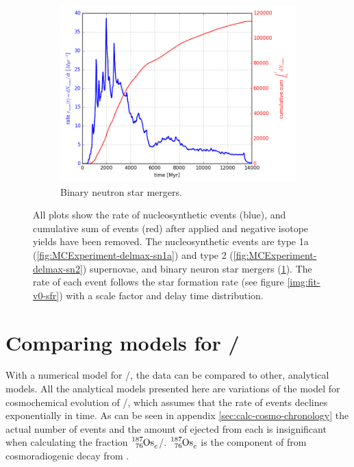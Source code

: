 \begin{figure}
\begin{subfigure}{\figwidth}
    \includegraphics[width=\linewidth]{results/MCExperiment_revised_2_delmax/nsm.png}
    \caption{ \label{fig:MCExperiment-delmax-nsm} \footnotesize
      Binary neutron star mergers.
    }
  \end{subfigure}
  \caption[Rate of nucleosynthetic events]{ \label{fig:MCExperiment-delmax-rate}
    All plots show the rate of nucleosynthetic events (blue), and cumulative sum of events (red)
    after \betadecay applied and negative isotope yields have been removed.
    The nucleosynthetic events are type 1a (\ref{fig:MCExperiment-delmax-sn1a}) and type 2 (\ref{fig:MCExperiment-delmax-sn2})
    supernovae, and binary neuron star mergers (\ref{fig:MCExperiment-delmax-nsm}).
    The rate of each event follows the star formation rate (see figure \ref{img:fit-v0-sfr}) with a scale factor and delay time distribution.
  } 
\end{figure}
\FloatBarrier %

\section{Comparing models for /}
With a numerical model for /, the data can be compared to other, analytical models.
All the analytical models presented here are variations of the  model for cosmochemical evolution of /,
which assumes that the rate of events declines exponentially in time.
As can be seen in appendix \ref{sec:calc-cosmo-chronology} the actual number of events and the amount of  ejected from each is insignificant when calculating the fraction $\os{187}_c$/. $\os{187}_c$ is the component of  from cosmoradiogenic decay from .

